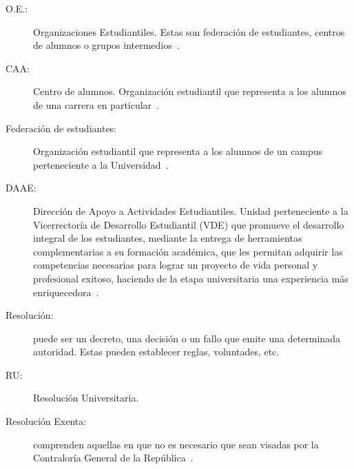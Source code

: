 \begin{glosario}
	\item 	\begin{description}
			    \item[O.E.:] Organizaciones Estudiantiles. Estas son federación de estudiantes, centros de alumnos o grupos intermedios~\cite{2}.
			\end{description}

	\item 	\begin{description}
			    \item[CAA:] Centro de alumnos. Organización estudiantil que representa a los alumnos de una carrera en particular~\cite{3}.
			\end{description}

	\item 	\begin{description}
			    \item[Federación de estudiantes:] Organización estudiantil que representa a los alumnos de un campus perteneciente a la Universidad~\cite{2}.
			\end{description}

	\item 	\begin{description}
				\item[DAAE:] Dirección de Apoyo a Actividades Estudiantiles. Unidad perteneciente a la Vicerrectoría de Desarrollo Estudiantil (VDE) que promueve el desarrollo integral de los estudiantes, mediante la entrega de herramientas complementarias a su formación académica, que les permitan adquirir las competencias necesarias para lograr un proyecto de vida personal y profesional exitoso, haciendo de la etapa universitaria una experiencia más enriquecedora~\cite{1}.
			\end{description}

	\item 	\begin{description}
			    \item[Resolución:] puede ser un decreto, una decisión o un fallo que emite una determinada autoridad. Estas pueden establecer reglas, voluntades, etc.
			\end{description}
	
	\item 	\begin{description}
				\item[RU:] Resolución Universitaria.
			\end{description}

	\item 	\begin{description}
			    \item[Resolución Exenta:] comprenden aquellas en que no es necesario que sean visadas por la Contraloría General de la República~\cite{3}.
			\end{description}


\end{glosario}
